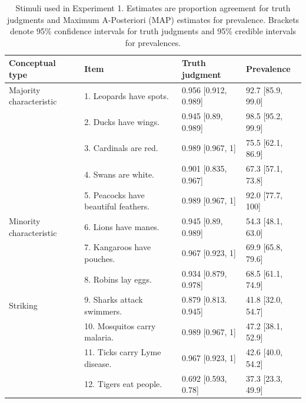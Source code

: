 \documentclass[10pt,letterpaper]{article}
\begin{document}
 








\begin{table}[h]
\centering

\caption{Stimuli used in Experiment 1. 
Estimates are proportion agreement for truth judgments and Maximum A-Posteriori (MAP) estimates for prevalence. 
Brackets denote 95\% confidence intervals for truth judgments and 95\% credible intervals for prevalences.}
\begin{tabular}{| l | l | p{3.5cm} | p{3.5cm} |}
\hline
Conceptual type & Item & Truth judgment & Prevalence \\
\hline \hline
Majority characteristic       & 1. Leopards have spots.    &0.956	[0.912, 0.989] & 92.7 [85.9, 99.0]\\
                                          & 2. Ducks have wings.                       &0.945	[0.89, 0.989] & 98.5 [95.2, 99.9]\\
                                          & 3. Cardinals are red.                       &0.989	[0.967, 1] & 75.5 [62.1, 86.9]\\
                                          & 4. Swans are white.                       &0.901	[0.835, 0.967] & 67.3 [57.1, 73.8] \\
                                          & 5. Peacocks have beautiful feathers. &  0.989	[0.967, 1] & 92.0 [77.7, 100] \\
Minority characteristic       & 6. Lions have manes.       &0.945	[0.89, 0.989] & 54.3 [48.1, 63.0]\\
                                          & 7. Kangaroos have pouches.                        &0.967 [0.923, 1]& 69.9 [65.8, 79.6]\\
                                          & 8. Robins lay eggs.                        &0.934	[0.879, 0.978]& 68.5 [61.1, 74.9]\\
Striking                      & 9. Sharks attack swimmers. &0.879	[0.813. 0.945] & 41.8 [32.0, 54.7]\\
                                  & 10. Mosquitos carry malaria.                        &0.989	[0.967, 1] & 47.2 [38.1,	 52.9]\\
                                  & 11. Ticks carry Lyme disease.                        &0.967	[0.923, 1] &  42.6 [40.0, 54.2]\\
                                  & 12. Tigers eat people.                        &0.692	[0.593, 0.78] & 37.3 [23.3, 49.9]\\

\end{tabular}
\end{table}
\end{document}
